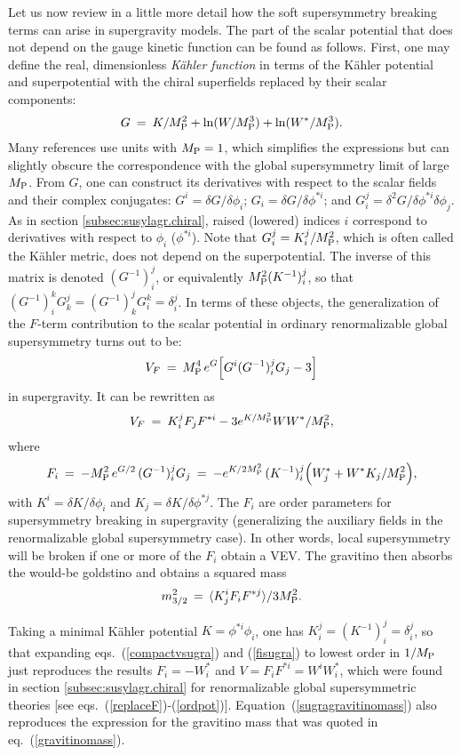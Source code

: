 \documentclass[12pt]{article}
\def\beq{\begin{eqnarray}}
\def\eeq{\end{eqnarray}}
\def\MPlanck{M_{\rm P}}
\begin{document}
Let us now review in a little more detail how the soft supersymmetry 
breaking terms can arise in supergravity models. The part of the scalar 
potential that does not depend on the gauge kinetic function can be found 
as follows. First, one may define the real, dimensionless {\em K\"ahler 
function} in terms of the K\"ahler potential and superpotential with the 
chiral superfields replaced by their scalar components:
\beq
G \>=\> 
{K/\MPlanck^2} + {\rm ln}({W/\MPlanck^3}) +{\rm ln}{(W^*/\MPlanck^3)}.
\label{eq:defKahlerfun}
\eeq
Many references use units with $\MPlanck=1$,
which simplifies the expressions but can slightly obscure the
correspondence with the global supersymmetry limit of large $\MPlanck$.
From $G$, one can construct its derivatives with respect to the scalar
fields and their complex conjugates: $G^i = {\delta G/\delta \phi_i}$; 
$G_i = {\delta G/\delta \phi^{* i}}$; and $G_i^j = {\delta^2
G/\delta\phi^{* i}\delta\phi_j}$. As in section 
\ref{subsec:susylagr.chiral}, raised (lowered) indices $i$
correspond to derivatives with respect to $\phi_i$ ($\phi^{*i}$). 
Note that $G_i^j =
K_i^j/\MPlanck^2$, which is often called the K\"ahler metric, does not
depend on the superpotential.  The inverse of this matrix is denoted
$(G^{-1})_i^j$, or equivalently $\MPlanck^2 (K^{-1})_i^j$, so that
$(G^{-1})^k_i G_k^j = (G^{-1})^j_k G_i^k = \delta_i^j$. In terms of these
objects, the generalization of the $F$-term contribution to the
scalar potential in ordinary renormalizable global supersymmetry turns out
\cite{supergravity,superconformalsupergravity} to be: 
\beq
V_F \>=\> \MPlanck^4 \, e^G \Bigl [ G^i (G^{-1})_i^j G_j -3 \Bigr ]
\label{vsugra}
\eeq
in supergravity. It can be rewritten as
\beq
V_F \>=\> K_i^j F_j F^{*i} - 3 e^{K/\MPlanck^2} WW^*/\MPlanck^2 ,
\label{compactvsugra}
\eeq
where
\beq
F_i \>=\> -\MPlanck^2\, e^{G/2} \, (G^{-1})_i^j G_j 
    \>=\> -e^{K/2 \MPlanck^2}\, (K^{-1})_i^j
\Bigl ( W^*_j + W^* K_j/\MPlanck^2 \Bigr ),
\label{fisugra}
\eeq
with $K^i = \delta K/\delta \phi_i$ and $K_j = \delta K/\delta \phi^{*j}$.
The $F_i$ are order parameters for supersymmetry breaking in supergravity
(generalizing the auxiliary fields in the renormalizable global
supersymmetry case). In other words, local supersymmetry will be broken if
one or more of the $F_i$ obtain a VEV. The gravitino then absorbs the
would-be goldstino and obtains a squared mass
\beq
m^2_{3/2} \,=\, \langle K_j^i F_i F^{*j}\rangle/3\MPlanck^2.
\label{sugragravitinomass}
\eeq

Taking a minimal K\"ahler potential $ K = \phi^{*i} \phi_i $, 
one has $K_i^j=(K^{-1})_i^j = \delta_i^j$, so that expanding 
eqs.~(\ref{compactvsugra}) and (\ref{fisugra}) to lowest order in 
$1/\MPlanck$ just reproduces the results $F_i = -W^*_i$ and $V = F_i 
F^{*i} = W^i W_i^*$, which were found in section 
\ref{subsec:susylagr.chiral} for renormalizable global supersymmetric 
theories [see eqs.~(\ref{replaceF})-(\ref{ordpot})]. 
Equation~(\ref{sugragravitinomass}) also reproduces the expression for the 
gravitino mass that was quoted in eq.~(\ref{gravitinomass}).
\end{document}
